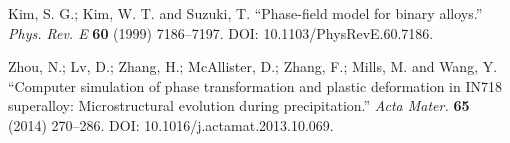 \documentclass[10pt]{article}
\begin{document}
	\begin{thebibliography}{1}
		 Kim, S. G.; Kim, W. T. and Suzuki, T. ``Phase-field model for binary alloys.'' \emph{Phys. Rev. E} \textbf{60} (1999) 7186--7197. DOI: 10.1103/PhysRevE.60.7186.

		 Zhou, N.; Lv, D.; Zhang, H.; McAllister, D.; Zhang, F.; Mills, M. and Wang, Y.
		                   ``Computer simulation of phase transformation and plastic deformation in IN718 superalloy: Microstructural evolution during precipitation.''
		                   \emph{Acta Mater.} \textbf{65} (2014) 270--286. DOI: 10.1016/j.actamat.2013.10.069.
	\end{thebibliography}
\end{document}
